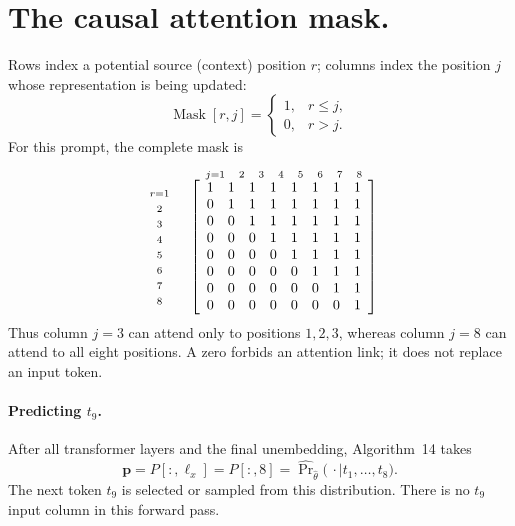 \documentclass[12pt]{article}
\begin{document}
\section*{The causal attention mask.}
Rows index a potential source (context) position \(r\); columns index
the position \(j\) whose representation is being updated:
\[
    \operatorname{Mask}[r,j] =
        \begin{cases}
        1, & r\leq j,\\
        0, & r>j.
        \end{cases}
\]
For this prompt, the complete mask is
\[
\begin{array}{c@{\quad}c}
&
\begin{array}{cccccccc}
\scriptstyle j=1&\scriptstyle 2&\scriptstyle 3&\scriptstyle 4&
\scriptstyle 5&\scriptstyle 6&\scriptstyle 7&\scriptstyle 8
\end{array}
\\[-2pt]
\begin{array}{c}
\scriptstyle r=1\\[-1pt]\scriptstyle 2\\[-1pt]\scriptstyle 3\\[-1pt]
\scriptstyle 4\\[-1pt]\scriptstyle 5\\[-1pt]\scriptstyle 6\\[-1pt]
\scriptstyle 7\\[-1pt]\scriptstyle 8
\end{array}
&
\left[
\begin{array}{cccccccc}
1&1&1&1&1&1&1&1\\
0&1&1&1&1&1&1&1\\
0&0&1&1&1&1&1&1\\
0&0&0&1&1&1&1&1\\
0&0&0&0&1&1&1&1\\
0&0&0&0&0&1&1&1\\
0&0&0&0&0&0&1&1\\
0&0&0&0&0&0&0&1
\end{array}
\right]
\end{array}
\]
Thus column \(j=3\) can attend only to positions \(1,2,3\), whereas
column \(j=8\) can attend to all eight positions. A zero forbids an
attention link; it does not replace an input token.

\paragraph{Predicting \(t_9\).}
After all transformer layers and the final unembedding, Algorithm~14
takes
\[
\mathbf{p}=P[:,\ell_x]=P[:,8]
 =\widehat{\Pr}_{\hat\theta}
   \bigl(\,\cdot\mid t_1,\ldots,t_8\bigr).
\]
The next token \(t_9\) is selected or sampled from this distribution.
There is no \(t_9\) input column in this forward pass.
\end{document}

